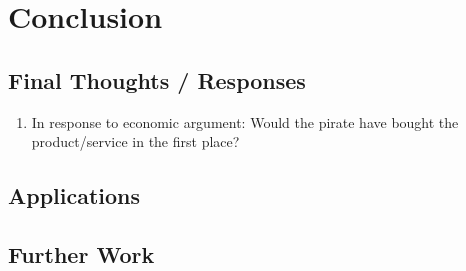 \documentclass[onecolumn, 12pt]{article}
\begin{document}
\section{Conclusion}

\subsection{Final Thoughts / Responses}

\begin{enumerate}
  \item In response to economic argument: Would the pirate have bought the
    product/service in the first place?
\end{enumerate}

\subsection{Applications}

\subsection{Further Work}

\clearpage
\nocite{*}
\printbibliography
\end{document}
